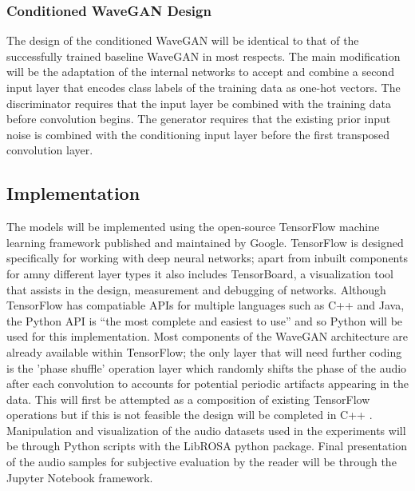 \documentclass[a4paper, dvipsnames, titlepage]{article}
\begin{document}
\subsubsection{Conditioned WaveGAN Design}

The design of the conditioned WaveGAN will be identical to that of the successfully trained baseline WaveGAN in most respects.
The main modification will be the adaptation of the internal networks to accept and combine a second input layer that encodes class labels of the training data as one-hot vectors.
The discriminator requires that the input layer be combined with the training data before convolution begins.
The generator requires that the existing prior input noise is combined with the conditioning input layer before the first transposed convolution layer.

\subsection{Implementation}

The models will be implemented using the open-source TensorFlow machine learning framework published and maintained by Google.
TensorFlow is designed specifically for working with deep neural networks; apart from inbuilt components for amny different layer types it also includes TensorBoard, a visualization tool that assists in the design, measurement and debugging of networks.
Although TensorFlow has compatiable APIs for multiple languages such as C++ and Java, the Python API is ``the most complete and easiest to use'' \citep{TensorFlowAPI} and so Python will be used for this implementation.
\newline
\newline
Most components of the WaveGAN architecture are already available within TensorFlow; the only layer that will need further coding is the 'phase shuffle' operation layer which randomly shifts the phase of the audio after each convolution to accounts for potential periodic artifacts appearing in the data.
This will first be attempted as a composition of existing TensorFlow operations but if this is not feasible the design will be completed in C++ \citep{TensorFlowAPIOps}.
\newline
\newline
Manipulation and visualization of the audio datasets used in the experiments will be through Python scripts with the LibROSA python package.
Final presentation of the audio samples for subjective evaluation by the reader will be through the Jupyter Notebook framework.
\end{document}
